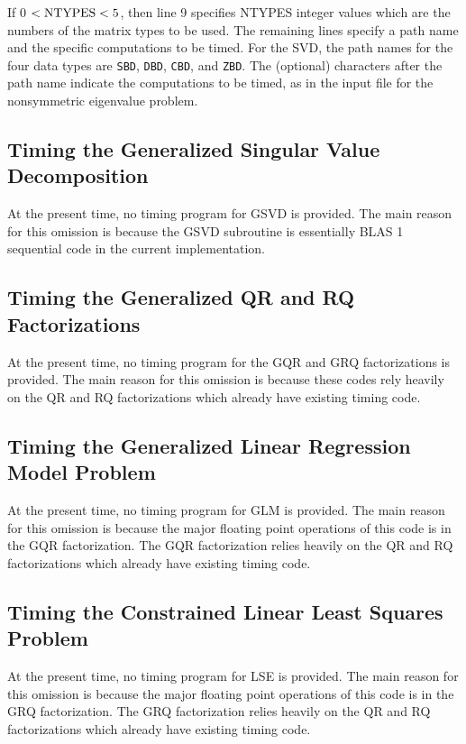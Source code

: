 If 0 $< {\rm NTYPES} < 5 $,
then line 9 specifies NTYPES integer values
which are the numbers of the matrix types to be used.
The remaining lines specify a path name and the specific
computations to be timed. 
For the SVD, the path names for the four
data types are {\tt SBD}, {\tt DBD}, {\tt CBD}, and {\tt ZBD}. 
The (optional) characters after the path name indicate the computations
to be timed, as in the input file for the nonsymmetric eigenvalue
problem.

\subsection{Timing the Generalized Singular Value Decomposition}

\dent
At the present time, no timing program for GSVD is provided.
The main reason for this omission is because the GSVD subroutine is 
essentially BLAS 1 sequential code in the current implementation.   

\subsection{Timing the Generalized QR and RQ Factorizations}

\dent
At the present time, no timing program for the GQR and GRQ
factorizations is provided. The main reason for this omission is because these
codes rely heavily on the QR and RQ factorizations which already
have existing timing code.

\subsection{Timing the Generalized Linear Regression Model Problem} 

\dent
At the present time, no timing program for GLM is provided.  The main
reason for this omission is because the major floating point operations of 
this code is in the GQR factorization. The GQR factorization relies 
heavily on the QR and RQ factorizations which already
have existing timing code. 

\subsection{Timing the Constrained Linear Least Squares Problem} 

\dent
At the present time, no timing program for LSE is provided.  The main
reason for this omission is because the major floating point operations of
this code is in the GRQ factorization. The GRQ factorization relies
heavily on the QR and RQ factorizations which already have existing timing 
code.

